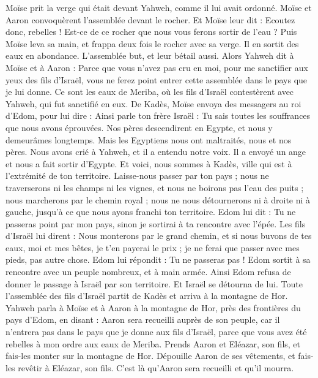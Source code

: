 \begin{multicols}{2}
Moïse prit la verge qui était devant Yahweh, comme il lui avait ordonné.
Moïse et Aaron convoquèrent l'assemblée devant le rocher. Et Moïse leur dit : Ecoutez donc, rebelles ! Est-ce de ce rocher que nous vous ferons sortir de l'eau ?
Puis Moïse leva sa main, et frappa deux fois le rocher avec sa verge. Il en sortit des eaux en abondance. L'assemblée but, et leur bétail aussi.
Alors Yahweh dit à Moïse et à Aaron : Parce que vous n'avez pas cru en moi, pour me sanctifier aux yeux des fils d'Israël, vous ne ferez point entrer cette assemblée dans le pays que je lui donne.
Ce sont les eaux de Meriba, où les fils d'Israël contestèrent avec Yahweh, qui fut sanctifié en eux.
De Kadès, Moïse envoya des messagers au roi d'Edom, pour lui dire : Ainsi parle ton frère Israël : Tu sais toutes les souffrances que nous avons éprouvées.
Nos pères descendirent en Egypte, et nous y demeurâmes longtemps. Mais les Egyptiens nous ont maltraités, nous et nos pères.
Nous avons crié à Yahweh, et il a entendu notre voix. Il a envoyé un ange et nous a fait sortir d'Egypte. Et voici, nous sommes à Kadès, ville qui est à l’extrémité de ton territoire.
Laisse-nous passer par ton pays ; nous ne traverserons ni les champs ni les vignes, et nous ne boirons pas l'eau des puits ; nous marcherons par le chemin royal ; nous ne nous détournerons ni à droite ni à gauche, jusqu'à ce que nous ayons franchi ton territoire.
Edom lui dit : Tu ne passeras point par mon pays, sinon je sortirai à ta rencontre avec l’épée.
Les fils d'Israël lui dirent : Nous monterons par le grand chemin, et si nous buvons de tes eaux, moi et mes bêtes, je t'en payerai le prix ; je ne ferai que passer avec mes pieds, pas autre chose.
Edom lui répondit : Tu ne passeras pas ! Edom sortit à sa rencontre avec un peuple nombreux, et à main armée.
Ainsi Edom refusa de donner le passage à Israël par son territoire. Et Israël se détourna de lui.
Toute l’assemblée des fils d'Israël partit de Kadès et arriva à la montagne de Hor.
Yahweh parla à Moïse et à Aaron à la montagne de Hor, près des frontières du pays d'Edom, en disant :
Aaron sera recueilli auprès de son peuple, car il n'entrera pas dans le pays que je donne aux fils d'Israël, parce que vous avez été rebelles à mon ordre aux eaux de Meriba.
Prends Aaron et Eléazar, son fils, et fais-les monter sur la montagne de Hor.
Dépouille Aaron de ses vêtements, et fais-les revêtir à Eléazar, son fils. C’est là qu’Aaron sera recueilli et qu’il mourra.

\end{multicols}
